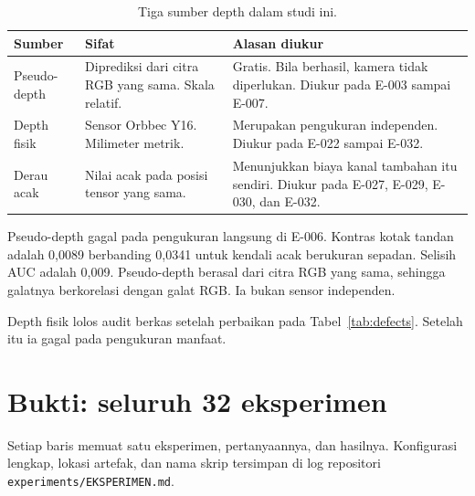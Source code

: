 \documentclass[preprint,12pt]{elsarticle}
\newcommand{\E}[1]{E-#1}
\begin{document}
\begin{table}[H]
\centering
\caption{Tiga sumber depth dalam studi ini.}
\label{tab:depthkinds}
\begin{tabularx}{\columnwidth}{L{0.22\columnwidth}L{0.24\columnwidth}Y}
\toprule
\textbf{Sumber} & \textbf{Sifat} & \textbf{Alasan diukur}\\
\midrule
Pseudo-depth & Diprediksi dari citra RGB yang sama. Skala relatif. & Gratis.
Bila berhasil, kamera tidak diperlukan. Diukur pada \E{003} sampai \E{007}.\\
Depth fisik & Sensor Orbbec Y16. Milimeter metrik. & Merupakan pengukuran
independen. Diukur pada \E{022} sampai \E{032}.\\
Derau acak & Nilai acak pada posisi tensor yang sama. & Menunjukkan biaya kanal
tambahan itu sendiri. Diukur pada \E{027}, \E{029}, \E{030}, dan \E{032}.\\
\bottomrule
\end{tabularx}
\end{table}

Pseudo-depth gagal pada pengukuran langsung di \E{006}. Kontras kotak tandan
adalah 0,0089 berbanding 0,0341 untuk kendali acak berukuran sepadan. Selisih
AUC adalah 0,009. Pseudo-depth berasal dari citra RGB yang sama, sehingga
galatnya berkorelasi dengan galat RGB. Ia bukan sensor independen.

Depth fisik lolos audit berkas setelah perbaikan pada
Tabel~\ref{tab:defects}. Setelah itu ia gagal pada pengukuran manfaat.

\section{Bukti: seluruh 32 eksperimen}
\label{sec:experiments}

Setiap baris memuat satu eksperimen, pertanyaannya, dan hasilnya. Konfigurasi
lengkap, lokasi artefak, dan nama skrip tersimpan di log repositori
\texttt{experiments/EKSPERIMEN.md}.
\end{document}
